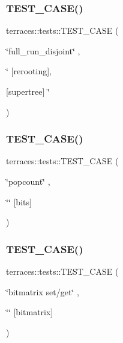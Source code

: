 \subsubsection{\texorpdfstring{T\+E\+S\+T\+\_\+\+C\+A\+S\+E()}{TEST\_CASE()}\hspace{0.1cm}{\footnotesize\ttfamily [16/78]}}
{\footnotesize\ttfamily terraces\+::tests\+::\+T\+E\+S\+T\+\_\+\+C\+A\+SE (\begin{DoxyParamCaption}\item[{\char`\"{}full\+\_\+run\+\_\+disjoint\char`\"{}}]{,  }\item[{\char`\"{}}]{\mbox{[}rerooting\mbox{]},  }\item[{\mbox{[}supertree\mbox{]} \char`\"{}}]{ }\end{DoxyParamCaption})}

\mbox{\label{namespaceterraces_1_1tests_a9280d3575eba24f61dedca5db6e1a9bc}} 
\subsubsection{\texorpdfstring{T\+E\+S\+T\+\_\+\+C\+A\+S\+E()}{TEST\_CASE()}\hspace{0.1cm}{\footnotesize\ttfamily [17/78]}}
{\footnotesize\ttfamily terraces\+::tests\+::\+T\+E\+S\+T\+\_\+\+C\+A\+SE (\begin{DoxyParamCaption}\item[{\char`\"{}popcount\char`\"{}}]{,  }\item[{\char`\"{}\char`\"{}}]{\mbox{[}bits\mbox{]} }\end{DoxyParamCaption})}

\mbox{\label{namespaceterraces_1_1tests_ac79b8331c2eaef1acc013d8c6ca2cacb}} 
\subsubsection{\texorpdfstring{T\+E\+S\+T\+\_\+\+C\+A\+S\+E()}{TEST\_CASE()}\hspace{0.1cm}{\footnotesize\ttfamily [18/78]}}
{\footnotesize\ttfamily terraces\+::tests\+::\+T\+E\+S\+T\+\_\+\+C\+A\+SE (\begin{DoxyParamCaption}\item[{\char`\"{}bitmatrix set/get\char`\"{}}]{,  }\item[{\char`\"{}\char`\"{}}]{\mbox{[}bitmatrix\mbox{]} }\end{DoxyParamCaption})}

